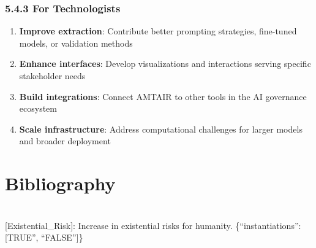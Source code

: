 \documentclass[
  11pt,
  letterpaper,
]{book}
\providecommand{\tightlist}{%
  \setlength{\itemsep}{0pt}\setlength{\parskip}{0pt}}
\begin{document}
\subsection{5.4.3 For
Technologists}\label{sec-technologist-recommendations}

\begin{enumerate}
\def\labelenumi{\arabic{enumi}.}
\tightlist
\item
  \textbf{Improve extraction}: Contribute better prompting strategies,
  fine-tuned models, or validation methods
\item
  \textbf{Enhance interfaces}: Develop visualizations and interactions
  serving specific stakeholder needs
\item
  \textbf{Build integrations}: Connect AMTAIR to other tools in the AI
  governance ecosystem
\item
  \textbf{Scale infrastructure}: Address computational challenges for
  larger models and broader deployment
\end{enumerate}


\chapter*{Bibliography}\label{bibliography}


\printbibliography[heading=none]

\cleardoublepage
{}
{}
\appendix

\chapter{}\label{section}

{[}Existential\_Risk{]}: Increase in existential risks for humanity.
\{``instantiations'': {[}TRUE'', ``FALSE''{]}\}
\end{document}
